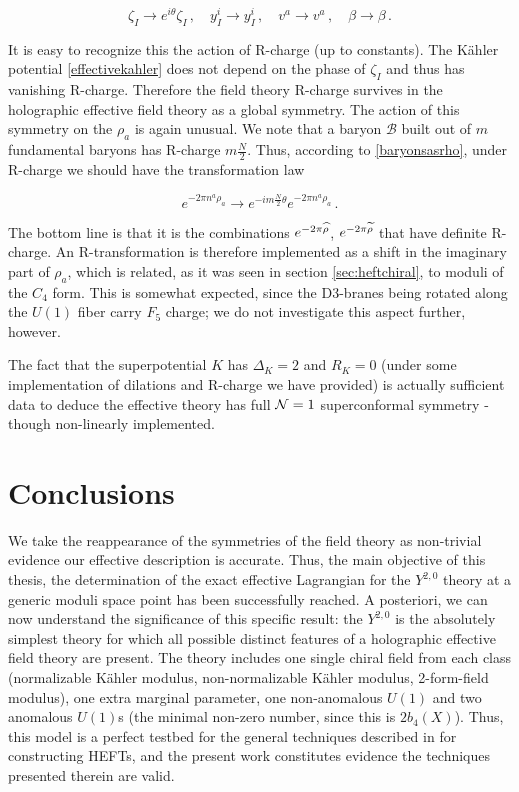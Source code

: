 \begin{equation}
	\zeta_I \rightarrow e^{i\theta} \zeta_I\,, \quad y^i_I \rightarrow y^i_I\,, \quad v^a \rightarrow v^a\,,\quad \beta \rightarrow \beta\,.
	\label{}
\end{equation}

It is easy to recognize this the action of R-charge (up to constants). The K\"ahler potential \eqref{effectivekahler} does not depend on the phase of $\zeta_I$ and thus has vanishing R-charge. Therefore the field theory R-charge survives in the holographic effective field theory as a global symmetry. The action of this symmetry on the $\rho_a$ is again unusual. We note that a baryon $\mathcal{B}$ built out of $m$ fundamental baryons has R-charge $m\frac{N}{2}$. Thus, according to \eqref{baryonsasrho}, under R-charge we should have the transformation law

\begin{equation}
	e^{-2\pi n^a \rho_a} \rightarrow e^{-im \frac{N}{2}\theta} e^{-2\pi n^a \rho_a}\,.
	\label{}
\end{equation}

The bottom line is that it is the combinations $e^{-2\pi \widehat{\rho}}$, $e^{-2\pi\widetilde{\rho}}$ that have definite R-charge. An R-transformation is therefore implemented as a shift in the imaginary part of $\rho_a$, which is related, as it was seen in section \ref{sec:heftchiral}, to moduli of the $C_4$ form. This is somewhat expected, since the D3-branes being rotated along the $U(1)$ fiber carry $F_5$ charge; we do not investigate this aspect further, however.

The fact that the superpotential $K$ has $\Delta_K = 2$ and $R_K = 0$ (under some implementation of dilations and R-charge we have provided) is actually sufficient data \cite{proofscft} to deduce the effective theory has full $\mathcal{N} = 1$ superconformal symmetry - though non-linearly implemented.


\section{Conclusions}

We take the reappearance of the symmetries of the field theory as non-trivial evidence our effective description is accurate. Thus, the main objective of this thesis, the determination of the exact effective Lagrangian for the $Y^{2,0}$ theory at a generic moduli space point has been successfully reached. A posteriori, we can now understand the significance of this specific result: the $Y^{2,0}$ is the absolutely simplest theory for which all possible distinct features of a holographic effective field theory are present. The theory includes one single chiral field from each class (normalizable K\"ahler modulus, non-normalizable K\"ahler modulus, 2-form-field modulus), one extra marginal parameter, one non-anomalous $U(1)$ and two anomalous $U(1)$s (the minimal non-zero number, since this is $2b_4(X)$). Thus, this model is a perfect testbed for the general techniques described in \cite{MZ} for constructing HEFTs, and the present work constitutes evidence the techniques presented therein are valid.

